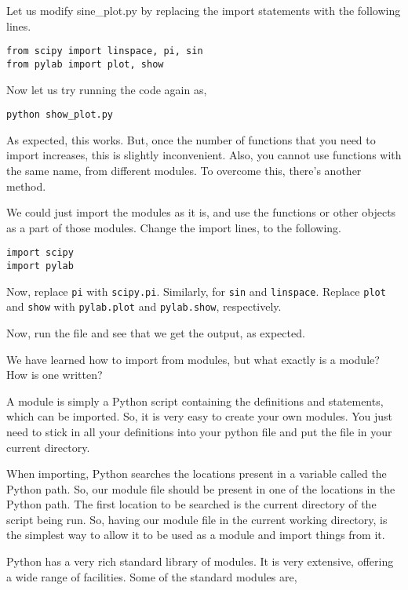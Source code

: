 \documentclass[presentation]{beamer}
\begin{document}
Let us modify sine\_plot.py by replacing the import statements with the
following lines.

\begin{verbatim}
from scipy import linspace, pi, sin
from pylab import plot, show
\end{verbatim}

Now let us try running the code again as,

\begin{verbatim}
python show_plot.py
\end{verbatim}

As expected, this works. But, once the number of functions that you need
to import increases, this is slightly inconvenient. Also, you cannot use
functions with the same name, from different modules. To overcome this,
there's another method.

We could just import the modules as it is, and use the functions or
other objects as a part of those modules. Change the import lines, to
the following.

\begin{verbatim}
import scipy
import pylab
\end{verbatim}

Now, replace \texttt{pi} with \texttt{scipy.pi}. Similarly, for \texttt{sin} and \texttt{linspace}.
Replace \texttt{plot} and \texttt{show} with \texttt{pylab.plot} and \texttt{pylab.show},
respectively.

Now, run the file and see that we get the output, as expected.

We have learned how to import from modules, but what exactly is a
module? How is one written?

A module is simply a Python script containing the definitions and
statements, which can be imported. So, it is very easy to create your
own modules. You just need to stick in all your definitions into your
python file and put the file in your current directory.

When importing, Python searches the locations present in a variable
called the Python path. So, our module file should be present in one of
the locations in the Python path. The first location to be searched is
the current directory of the script being run. So, having our module
file in the current working directory, is the simplest way to allow it
to be used as a module and import things from it.

Python has a very rich standard library of modules. It is very
extensive, offering a wide range of facilities. Some of the standard
modules are,
\end{document}
